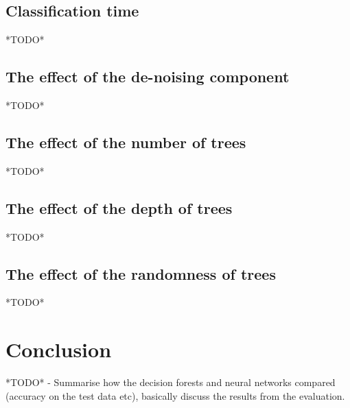 \documentclass[12pt,twoside,notitlepage]{report}
\begin{document}
    \section{Classification time}
    *TODO*

    \section{The effect of the de-noising component}
    *TODO*

    \section{The effect of the number of trees}
    *TODO*

    \section{The effect of the depth of trees}
    *TODO*

    \section{The effect of the randomness of trees}
    *TODO*














\cleardoublepage
\chapter{Conclusion}
    *TODO* - Summarise how the decision forests and neural networks compared (accuracy on the test data etc), basically 
    discuss the results from the evaluation.
\end{document}

